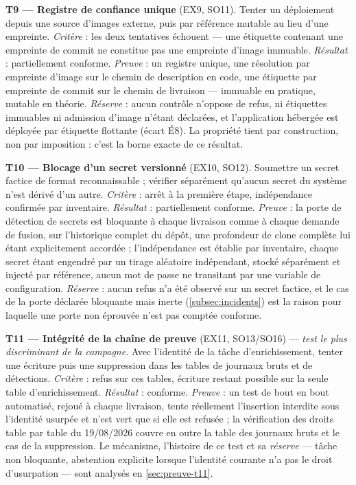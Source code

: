 \textbf{T9 --- Registre de confiance unique} (EX9, SO11). Tenter un déploiement depuis une source
d'images externe, puis par référence mutable au lieu d'une empreinte. \emph{Critère} : les deux
tentatives échouent \cite{slsa_framework} --- une étiquette contenant une empreinte de commit ne
constitue pas une empreinte d'image immuable. \emph{Résultat} : partiellement conforme.
\emph{Preuve} : un registre unique, une résolution par empreinte d'image sur le chemin de
description en code, une étiquette par empreinte de commit sur le chemin de livraison --- immuable
en pratique, mutable en théorie. \emph{Réserve} : aucun contrôle n'oppose de refus, ni étiquettes
immuables ni admission d'image n'étant déclarées, et l'application hébergée est déployée par
étiquette flottante (écart É8). La propriété tient par construction, non par imposition : c'est la
borne exacte de ce résultat.

\textbf{T10 --- Blocage d'un secret versionné} (EX10, SO12). Soumettre un secret factice de format
reconnaissable ; vérifier séparément qu'aucun secret du système n'est dérivé d'un autre.
\emph{Critère} : arrêt à la première étape, indépendance confirmée par inventaire.
\emph{Résultat} : partiellement conforme. \emph{Preuve} : la porte de détection de secrets est
bloquante à chaque livraison comme à chaque demande de fusion, sur l'historique complet du dépôt,
une profondeur de clone complète lui étant explicitement accordée ; l'indépendance est établie par
inventaire, chaque secret étant engendré par un tirage aléatoire indépendant, stocké séparément et
injecté par référence, aucun mot de passe ne transitant par une variable de configuration.
\emph{Réserve} : aucun refus n'a été observé sur un secret factice, et le cas de la porte déclarée
bloquante mais inerte (\cref{subsec:incidents}) est la raison pour laquelle une porte non éprouvée
n'est pas comptée conforme.

\textbf{T11 --- Intégrité de la chaîne de preuve} (EX11, SO13/SO16) --- \emph{test le plus
discriminant de la campagne}. Avec l'identité de la tâche d'enrichissement, tenter une écriture
puis une suppression dans les tables de journaux bruts et de détections. \emph{Critère} : refus
sur ces tables, écriture restant possible sur la seule table d'enrichissement. \emph{Résultat} :
conforme. \emph{Preuve} : un test de bout en bout automatisé, rejoué à chaque livraison, tente
réellement l'insertion interdite sous l'identité usurpée et n'est vert que si elle est refusée ; la
vérification des droits table par table du 19/08/2026 couvre en outre la table des journaux bruts et
le cas de la suppression. Le mécanisme, l'histoire de ce test et sa \emph{réserve} --- tâche non
bloquante, abstention explicite lorsque l'identité courante n'a pas le droit d'usurpation --- sont
analysés en \cref{sec:preuve-t11}.

